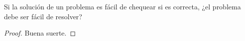 \begin{statement}{2}
    Si la soluci\'on de un problema es f\'acil de chequear si es correcta, ¿el problema debe ser f\'acil de resolver?
\end{statement}

\begin{proof}
    Buena suerte.
\end{proof}

